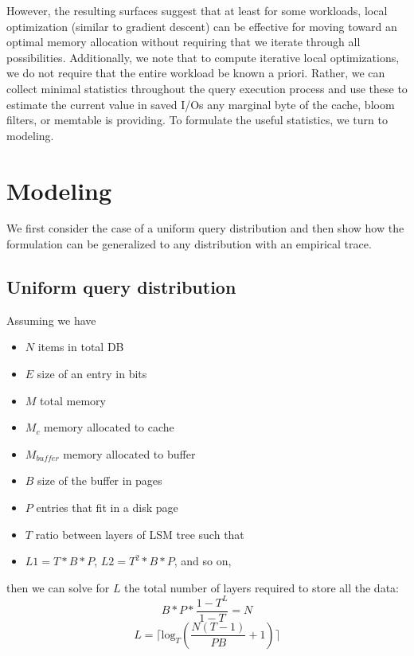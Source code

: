\documentclass{sig-alternate-05-2015}
\begin{document}
However, the resulting surfaces suggest that at least for some workloads, local
optimization (similar to gradient descent) can be effective for moving toward
an optimal memory allocation without requiring that we iterate through all
possibilities. Additionally, we note that to compute iterative local
optimizations, we do not require that the entire workload be known a priori.
Rather, we can collect minimal statistics throughout the query execution
process and use these to estimate the current value in saved I/Os any marginal
byte of the cache, bloom filters, or memtable is providing. To formulate the
useful statistics, we turn to modeling.

\section{Modeling}

We first consider the case of a uniform query distribution and then show how
the formulation can be generalized to any distribution with an empirical trace.

\subsection{Uniform query distribution}

\noindent Assuming we have
\begin{itemize}
\itemsep-1em
\item $N$ items in total DB \\
\item $E$ size of an entry in bits \\
\item $M$ total memory \\
\item $M_c$ memory allocated to cache \\
\item $M_{buffer}$ memory allocated to buffer\\
\item $B$ size of the buffer in pages \\
\item $P$ entries that fit in a disk page \\
\item $T$ ratio between layers of LSM tree such that \\
\item $L1 = T * B* P$, $L2 =T^2 * B*P $, and so on,
\end{itemize}

\noindent then we can solve for $L$ the total number of layers required to store all the data: \\
$$B*P * \frac{1-T^L}{1-T} = N$$
$$L= \lceil \textrm{log}_{T} \left(\frac{N(T-1)}{PB} + 1\right) \rceil$$
\end{document}
